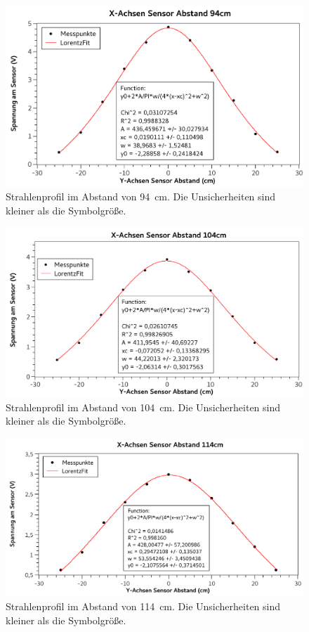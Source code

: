 \documentclass[
	a4paper,
	12pt,
	pagesize,
	ngerman
]{scrartcl}
\begin{document}
	\begin{figure}[H]
		\includegraphics[width=1\textwidth]{fig_94cm}
		\centering
		\caption{Strahlenprofil im Abstand von \SI{94}{cm}. Die Unsicherheiten sind kleiner als die Symbolgröße.}
		\label{fig_94cm}
		\centering
	\end{figure}
	\begin{figure}[H]
		\includegraphics[width=1\textwidth]{fig_104cm}
		\centering
		\caption{Strahlenprofil im Abstand von \SI{104}{cm}. Die Unsicherheiten sind kleiner als die Symbolgröße.}
		\label{fig_104cm}
		\centering
	\end{figure}
	\begin{figure}[H]
		\includegraphics[width=1\textwidth]{fig_114cm}
		\centering
		\caption{Strahlenprofil im Abstand von \SI{114}{cm}. Die Unsicherheiten sind kleiner als die Symbolgröße.}
		\label{fig_114cm}
		\centering
	\end{figure}
\end{document}
